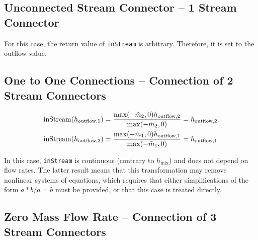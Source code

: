 \subsection{Unconnected Stream Connector -- 1 Stream Connector}\label{stream-connector-is-not-connected-n-1}\label{unconnected-stream-connector-1-stream-connector}

For this case, the return value of \lstinline!inStream! is arbitrary.
Therefore, it is set to the outflow value.

\subsection{One to One Connections -- Connection of 2 Stream Connectors}\label{connection-of-2-stream-connectors-one-to-one-connections-n-2}\label{one-to-one-connections-connection-of-2-stream-connectors}

\begin{align*}
\text{\lstinline!inStream!}(h_{\mathrm{outflow},1}) &= \frac{\operatorname{max}(-\tilde{m}_2,0)h_{\mathrm{outflow},2}}{\operatorname{max}(-\tilde{m}_2,0)}=h_{\mathrm{outflow},2}\\
\text{\lstinline!inStream!}(h_{\mathrm{outflow},2}) &= \frac{\operatorname{max}(-\tilde{m}_1,0)h_{\mathrm{outflow},1}}{\operatorname{max}(-\tilde{m}_1,0)}=h_{\mathrm{outflow},1}
\end{align*}

In this case, \lstinline!inStream! is continuous (contrary to $h_{\mathrm{mix}}$) and does not depend on flow rates.
The latter result means that this transformation may remove nonlinear systems of equations, which requires that either simplifications of the form $a * b / a = b$ must be provided, or that this case is treated directly.

\subsection{Zero Mass Flow Rate -- Connection of 3 Stream Connectors}\label{connection-of-3-stream-connectors-where-one-mass-flow-rate-is-identical-to-zero-n-3-and}\label{zero-mass-flow-rate-connection-of-3-stream-connectors}

